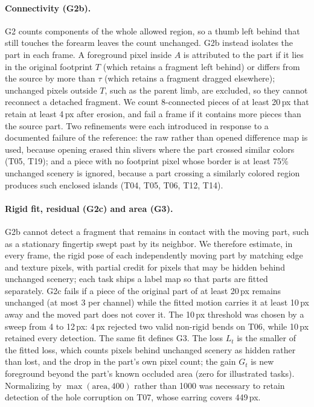\documentclass[11pt]{article}
\newcommand{\chk}[1]{\textsf{#1}}
\begin{document}
\paragraph{Connectivity (\chk{G2b}).} \chk{G2} counts components of the whole allowed region, so a thumb left behind that still touches the forearm leaves the count unchanged. \chk{G2b} instead isolates the part in each frame. A foreground pixel inside $A$ is attributed to the part if it lies in the original footprint $T$ (which retains a fragment left behind) or differs from the source by more than $\tau$ (which retains a fragment dragged elsewhere); unchanged pixels outside $T$, such as the parent limb, are excluded, so they cannot reconnect a detached fragment. We count 8-connected pieces of at least 20\,px that retain at least 4\,px after erosion, and fail a frame if it contains more pieces than the source part. Two refinements were each introduced in response to a documented failure of the reference: the raw rather than opened difference map is used, because opening erased thin slivers where the part crossed similar colors (T05, T19); and a piece with no footprint pixel whose border is at least 75\% unchanged scenery is ignored, because a part crossing a similarly colored region produces such enclosed islands (T04, T05, T06, T12, T14).

\paragraph{Rigid fit, residual (\chk{G2c}) and area (\chk{G3}).} \chk{G2b} cannot detect a fragment that remains in contact with the moving part, such as a stationary fingertip swept past by its neighbor. We therefore estimate, in every frame, the rigid pose of each independently moving part by matching edge and texture pixels, with partial credit for pixels that may be hidden behind unchanged scenery; each task ships a label map so that parts are fitted separately. \chk{G2c} fails if a piece of the original part of at least 20\,px remains unchanged (at most 3 per channel) while the fitted motion carries it at least 10\,px away and the moved part does not cover it. The 10\,px threshold was chosen by a sweep from 4 to 12\,px: 4\,px rejected two valid non-rigid bends on T06, while 10\,px retained every detection. The same fit defines \chk{G3}. The loss $L_t$ is the smaller of the fitted loss, which counts pixels behind unchanged scenery as hidden rather than lost, and the drop in the part's own pixel count; the gain $G_t$ is new foreground beyond the part's known occluded area (zero for illustrated tasks). Normalizing by $\max(\text{area}, 400)$ rather than 1000 was necessary to retain detection of the hole corruption on T07, whose earring covers 449\,px.
\end{document}

